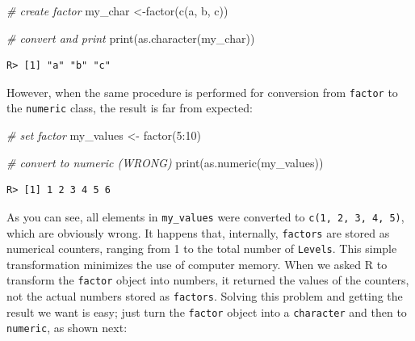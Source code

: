 \documentclass[
  12pt,
]{book}
\newenvironment{Shaded}{\begin{snugshade}}{\end{snugshade}}
\newcommand{\CommentTok}[1]{\textcolor[rgb]{0.37,0.37,0.37}{\textit{#1}}}
\newcommand{\DecValTok}[1]{\textcolor[rgb]{0.06,0.06,0.06}{#1}}
\newcommand{\FunctionTok}[1]{\textcolor[rgb]{0,0,0}{#1}}
\newcommand{\NormalTok}[1]{#1}
\newcommand{\OtherTok}[1]{\textcolor[rgb]{0.37,0.37,0.37}{#1}}
\newcommand{\SpecialCharTok}[1]{\textcolor[rgb]{0,0,0}{#1}}
\newcommand{\StringTok}[1]{\textcolor[rgb]{0.5,0.5,0.5}{#1}}
\begin{document}
\begin{Shaded}
\begin{Highlighting}[]
\CommentTok{\# create factor}
\NormalTok{my\_char }\OtherTok{\textless{}{-}}\FunctionTok{factor}\NormalTok{(}\FunctionTok{c}\NormalTok{(}\StringTok{\textquotesingle{}a\textquotesingle{}}\NormalTok{, }\StringTok{\textquotesingle{}b\textquotesingle{}}\NormalTok{, }\StringTok{\textquotesingle{}c\textquotesingle{}}\NormalTok{))}

\CommentTok{\# convert and print}
\FunctionTok{print}\NormalTok{(}\FunctionTok{as.character}\NormalTok{(my\_char))}
\end{Highlighting}
\end{Shaded}

\begin{verbatim}
R> [1] "a" "b" "c"
\end{verbatim}

However, when the same procedure is performed for conversion from \texttt{factor} to the \texttt{numeric} class, the result is far from expected: 

\begin{Shaded}
\begin{Highlighting}[]
\CommentTok{\# set factor}
\NormalTok{my\_values }\OtherTok{\textless{}{-}} \FunctionTok{factor}\NormalTok{(}\DecValTok{5}\SpecialCharTok{:}\DecValTok{10}\NormalTok{)}

\CommentTok{\# convert to numeric (WRONG)}
\FunctionTok{print}\NormalTok{(}\FunctionTok{as.numeric}\NormalTok{(my\_values))}
\end{Highlighting}
\end{Shaded}

\begin{verbatim}
R> [1] 1 2 3 4 5 6
\end{verbatim}

As you can see, all elements in \texttt{my\_values} were converted to \texttt{c(1,\ 2,\ 3,\ 4,\ 5)}, which are obviously wrong. It happens that, internally, \texttt{factors} are stored as numerical counters, ranging from 1 to the total number of \texttt{Levels}. This simple transformation minimizes the use of computer memory. When we asked R to transform the \texttt{factor} object into numbers, it returned the values of the counters, not the actual numbers stored as \texttt{factors}. Solving this problem and getting the result we want is easy; just turn the \texttt{factor} object into a \texttt{character} and then to \texttt{numeric}, as shown next:
\end{document}
